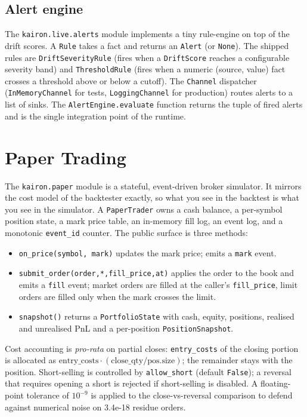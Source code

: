 \documentclass[11pt,a4paper]{article}
\let\oldsection\section
\renewcommand{\section}{\clearpage\oldsection}
\begin{document}
\subsection{Alert engine}
The \texttt{kairon.live.alerts} module implements a tiny
rule-engine on top of the drift scores. A \texttt{Rule}
takes a fact and returns an \texttt{Alert} (or
\texttt{None}). The shipped rules are
\texttt{DriftSeverityRule} (fires when a
\texttt{DriftScore} reaches a configurable severity band)
and \texttt{ThresholdRule} (fires when a numeric
(source, value) fact crosses a threshold above or below a
cutoff). The \texttt{Channel} dispatcher
(\texttt{InMemoryChannel} for tests,
\texttt{LoggingChannel} for production) routes alerts to a
list of sinks. The \texttt{AlertEngine.evaluate} function
returns the tuple of fired alerts and is the single
integration point of the runtime.

\section{Paper Trading}\label{sec:paper}

The \texttt{kairon.paper} module is a stateful, event-driven
broker simulator. It mirrors the cost model of the backtester
exactly, so what you see in the backtest is what you see in
the simulator. A \texttt{PaperTrader} owns a cash balance, a
per-symbol position state, a mark price table, an in-memory
fill log, an event log, and a monotonic
\texttt{event\_id} counter. The public surface is three
methods:
\begin{itemize}[leftmargin=1.2em,itemsep=0.05em,topsep=0.1em]
    \item \texttt{on\_price(symbol, mark)} updates the mark
    price; emits a \texttt{mark} event.
    \item \texttt{submit\_order(order,\;*,\;fill\_price,\;at)}
    applies the order to the book and emits a \texttt{fill}
    event; market orders are filled at the caller's
    \texttt{fill\_price}, limit orders are filled only when
    the mark crosses the limit.
    \item \texttt{snapshot()} returns a \texttt{PortfolioState}
    with cash, equity, positions, realised and unrealised PnL
    and a per-position \texttt{PositionSnapshot}.
\end{itemize}
Cost accounting is \emph{pro-rata} on partial closes:
\texttt{entry\_costs} of the closing portion is
allocated as
$\mathrm{entry\_costs}\cdot(\mathrm{close\_qty}/\mathrm{pos.size})$;
the remainder stays with the position. Short-selling is
controlled by \texttt{allow\_short} (default \texttt{False});
a reversal that requires opening a short is rejected if
short-selling is disabled. A floating-point tolerance of
$10^{-9}$ is applied to the close-vs-reversal comparison to
defend against numerical noise on 3.4e-18 residue orders.
\end{document}
